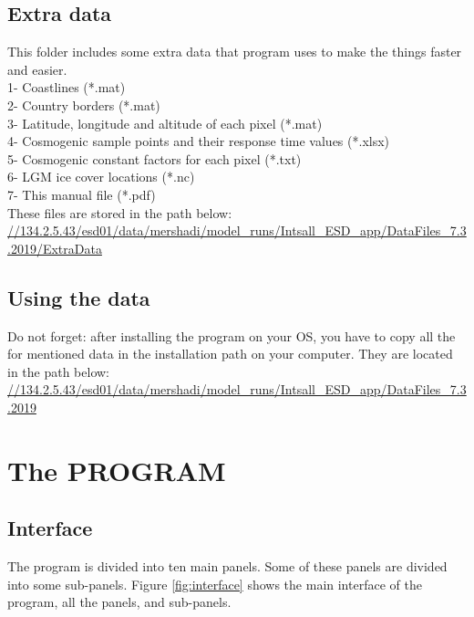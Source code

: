 \documentclass[11pt,a4paper,titlepage]{report}
\begin{document}
\section{Extra data}

This folder includes some extra data that program uses to make the things faster and easier.\\
1- Coastlines (*.mat)\\
2- Country borders (*.mat)\\
3- Latitude, longitude and altitude of each pixel (*.mat)\\
4- Cosmogenic sample points and their response time values (*.xlsx)\\
5- Cosmogenic constant factors for each pixel (*.txt)\\
6- LGM ice cover locations (*.nc)\\
7- This manual file (*.pdf)\\

These files are stored in the path below:\\
\url{//134.2.5.43/esd01/data/mershadi/model_runs/Intsall_ESD_app/DataFiles_7.3.2019/ExtraData}\\

\section{Using the data}

Do not forget: after installing the program on your OS, you have to copy all the for mentioned data in the installation path on your computer. They are located in the path below:\\
\url{//134.2.5.43/esd01/data/mershadi/model_runs/Intsall_ESD_app/DataFiles_7.3.2019}\\
\chapter{The PROGRAM}

\section{Interface}
The program is divided into ten main panels. Some of these panels are divided into some sub-panels. Figure \ref{fig:interface} shows the main interface of the program, all the panels, and sub-panels.
\end{document}
